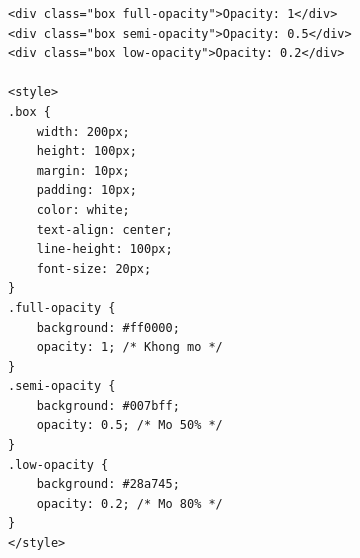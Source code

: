 \documentclass[11pt,oneside]{book}
\begin{document}
\begin{codeWindow}
\begin{lstlisting}[language=HTML5]
<div class="box full-opacity">Opacity: 1</div>
<div class="box semi-opacity">Opacity: 0.5</div>
<div class="box low-opacity">Opacity: 0.2</div>

<style>
.box {
    width: 200px;
    height: 100px;
    margin: 10px;
    padding: 10px;
    color: white;
    text-align: center;
    line-height: 100px;
    font-size: 20px;
}
.full-opacity {
    background: #ff0000;
    opacity: 1; /* Khong mo */
}
.semi-opacity {
    background: #007bff;
    opacity: 0.5; /* Mo 50% */
}
.low-opacity {
    background: #28a745;
    opacity: 0.2; /* Mo 80% */
}
</style>
\end{lstlisting}
\end{codeWindow}
\end{document}
